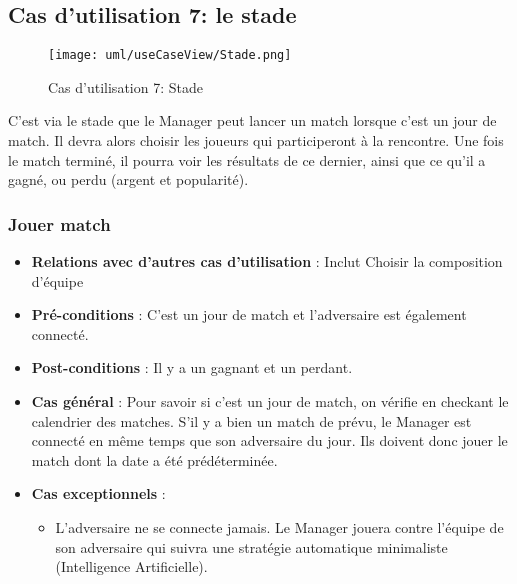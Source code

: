 \documentclass[a4paper,titlepage]{scrreprt}
\begin{document}
  \subsection{Cas d'utilisation 7: le stade}
  \begin{figure}[H]
    \center
    \texttt{[image: uml/useCaseView/Stade.png]}
    \caption{Cas d'utilisation 7: Stade}
  \end{figure}
  C'est via le \gls{stade}  que le Manager peut lancer un match lorsque c'est un jour de match. Il devra alors choisir les joueurs qui participeront à la rencontre. Une fois le match terminé, il pourra voir les résultats de ce dernier, ainsi que ce qu'il a gagné, ou perdu (argent et popularité).
    \subsubsection{Jouer match}
      \begin{itemize}
        \item \textbf{Relations avec d'autres cas d'utilisation}  : Inclut Choisir la composition d’équipe
        \item \textbf{Pré-conditions} : C’est un jour de match et l’adversaire est également connecté.
        \item \textbf{Post-conditions} : Il y a un gagnant et un perdant.
        \item \textbf{Cas général} : Pour savoir si c'est un jour de match, on vérifie en checkant le \gls{calendrier}  des matches. S'il y a bien un match de prévu, le Manager est connecté en même temps que son adversaire du jour. Ils doivent donc jouer le match dont la date a été prédéterminée.
        \item \textbf{Cas exceptionnels} : 
          \begin{itemize}
            \item L’adversaire ne se connecte jamais. Le Manager jouera contre l’équipe de son adversaire qui suivra une stratégie automatique minimaliste (Intelligence Artificielle).
          \end{itemize}
      \end{itemize}
\end{document}

